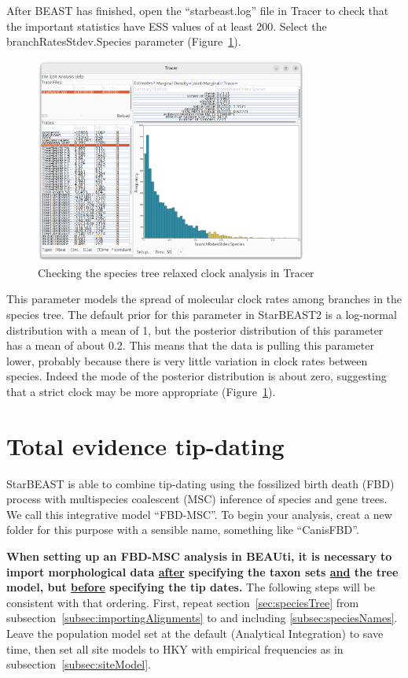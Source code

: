 \documentclass[12pt]{article}
\begin{document}
After BEAST has finished, open the ``starbeast.log'' file in Tracer to
check that the important statistics have ESS values of at least 200.
Select the branchRatesStdev.Species parameter (Figure~\ref{fig:tracerUCLN}).

\begin{figure}[htb!]
\centering
\includegraphics[width=0.8\textwidth]{figures/tracerUCLN.png}
\caption
{Checking the species tree relaxed clock analysis in Tracer}
\label{fig:tracerUCLN}
\end{figure}

This parameter models the spread of molecular clock rates among branches in
the species tree. The default prior for this parameter in StarBEAST2 is a
log-normal distribution with a mean of 1, but the posterior distribution of this
parameter has a mean of about 0.2. This means that the data is pulling this
parameter lower, probably because there is very little variation in clock
rates between species. Indeed the mode of the posterior distribution is about
zero, suggesting that a strict clock may be more appropriate
(Figure~\ref{fig:tracerUCLN}).{}

\section{Total evidence tip-dating}
\label{sec:FBD}

StarBEAST is able to combine
tip-dating using the fossilized birth death (FBD) process with multispecies
coalescent (MSC) inference of species and gene trees. We call this integrative
model ``FBD-MSC''. To begin your analysis, creat a new folder for this
purpose with a sensible name, something like ``CanisFBD''.

\textbf{When setting up an FBD-MSC analysis in BEAUti, it is necessary to
import morphological data \ul{after} specifying the taxon sets \ul{and} the
tree model, but \ul{before} specifying the tip dates.} The following steps
will be consistent with that ordering. First, repeat
section~\ref{sec:speciesTree} from subsection~\ref{subsec:importingAlignments}
to and including \ref{subsec:speciesNames}. Leave the population model set at
the default (Analytical Integration) to save time, then set
all site models to HKY with empirical frequencies as in
subsection~\ref{subsec:siteModel}.
\end{document}

